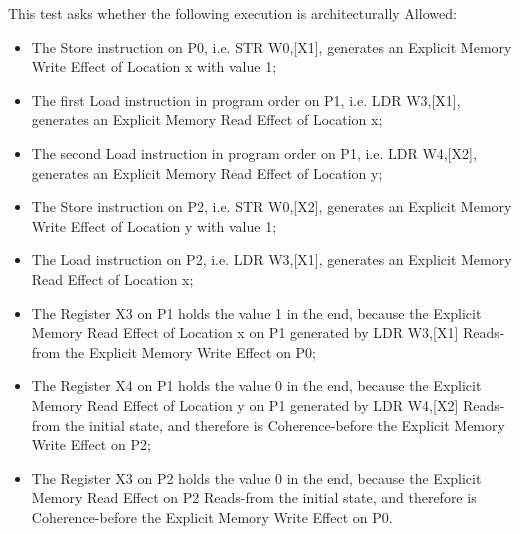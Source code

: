 This test asks whether the following execution is architecturally Allowed:

\begin{itemize}
  \item The Store instruction on P0, i.e. STR W0,[X1], generates an Explicit Memory Write Effect of Location x with value 1;
  \item The first Load instruction in program order on P1, i.e. LDR W3,[X1], generates an Explicit Memory Read Effect of Location x;
  \item The second Load instruction in program order on P1, i.e. LDR W4,[X2], generates an Explicit Memory Read Effect of Location y;
  \item The Store instruction on P2, i.e. STR W0,[X2], generates an Explicit Memory Write Effect of Location y with value 1;
  \item The Load instruction on P2, i.e. LDR W3,[X1], generates an Explicit Memory Read Effect of Location x;
  \item The Register X3 on P1 holds the value 1 in the end, because the Explicit Memory Read Effect of Location x on P1 generated by LDR W3,[X1] Reads-from the Explicit Memory Write Effect on P0;
  \item The Register X4 on P1 holds the value 0 in the end, because the Explicit Memory Read Effect of Location y on P1 generated by LDR W4,[X2] Reads-from the initial state, and therefore is Coherence-before the Explicit Memory Write Effect on P2;
  \item The Register X3 on P2 holds the value 0 in the end, because the Explicit Memory Read Effect on P2 Reads-from the initial state, and therefore is Coherence-before the Explicit Memory Write Effect on P0.
\end{itemize}
